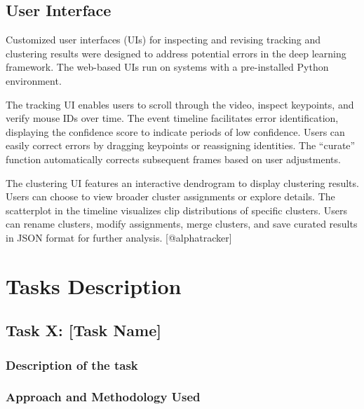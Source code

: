 \documentclass[
  11pt,
]{article}
\begin{document}
\hypertarget{user-interface}{%
\subsection{User Interface}\label{user-interface}}

Customized user interfaces (UIs) for inspecting and revising tracking
and clustering results were designed to address potential errors in the
deep learning framework. The web-based UIs run on systems with a
pre-installed Python environment.

The tracking UI enables users to scroll through the video, inspect
keypoints, and verify mouse IDs over time. The event timeline
facilitates error identification, displaying the confidence score to
indicate periods of low confidence. Users can easily correct errors by
dragging keypoints or reassigning identities. The ``curate'' function
automatically corrects subsequent frames based on user adjustments.

The clustering UI features an interactive dendrogram to display
clustering results. Users can choose to view broader cluster assignments
or explore details. The scatterplot in the timeline visualizes clip
distributions of specific clusters. Users can rename clusters, modify
assignments, merge clusters, and save curated results in JSON format for
further analysis. {[}@alphatracker{]}

\hypertarget{tasks-description}{%
\section{Tasks Description}\label{tasks-description}}

\hypertarget{task-x-task-name}{%
\subsection{Task X: {[}Task Name{]}}\label{task-x-task-name}}

\hypertarget{description-of-the-task}{%
\subsubsection{Description of the task}\label{description-of-the-task}}

\hypertarget{approach-and-methodology-used}{%
\subsubsection{Approach and Methodology
Used}\label{approach-and-methodology-used}}
\end{document}
